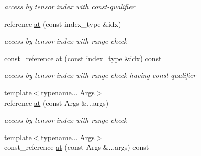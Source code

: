 \begin{DoxyCompactItemize}
\begin{DoxyCompactList}\small\item\em access by tensor index with const-\/qualifier \item\end{DoxyCompactList}\item 
\hypertarget{classbtas_1_1_tensor_view_a76bdf28b3b04dce368ce6a238518c542}{
reference \hyperlink{classbtas_1_1_tensor_view_a76bdf28b3b04dce368ce6a238518c542}{at} (const index\_\-type \&idx)}
\label{classbtas_1_1_tensor_view_a76bdf28b3b04dce368ce6a238518c542}

\begin{DoxyCompactList}\small\item\em access by tensor index with range check \item\end{DoxyCompactList}\item 
\hypertarget{classbtas_1_1_tensor_view_a124bce3d6f8c2631740e32fe8d774ab8}{
const\_\-reference \hyperlink{classbtas_1_1_tensor_view_a124bce3d6f8c2631740e32fe8d774ab8}{at} (const index\_\-type \&idx) const }
\label{classbtas_1_1_tensor_view_a124bce3d6f8c2631740e32fe8d774ab8}

\begin{DoxyCompactList}\small\item\em access by tensor index with range check having const-\/qualifier \item\end{DoxyCompactList}\item 
\hypertarget{classbtas_1_1_tensor_view_adc1e4cce96f14490f8a21118ef449be4}{
{\footnotesize template$<$typename... Args$>$ }\\reference \hyperlink{classbtas_1_1_tensor_view_adc1e4cce96f14490f8a21118ef449be4}{at} (const Args \&...args)}
\label{classbtas_1_1_tensor_view_adc1e4cce96f14490f8a21118ef449be4}

\begin{DoxyCompactList}\small\item\em access by tensor index with range check \item\end{DoxyCompactList}\item 
\hypertarget{classbtas_1_1_tensor_view_a742ca6336a3e9cc41707ab58e5b90902}{
{\footnotesize template$<$typename... Args$>$ }\\const\_\-reference \hyperlink{classbtas_1_1_tensor_view_a742ca6336a3e9cc41707ab58e5b90902}{at} (const Args \&...args) const }
\label{classbtas_1_1_tensor_view_a742ca6336a3e9cc41707ab58e5b90902}


\end{DoxyCompactItemize}
